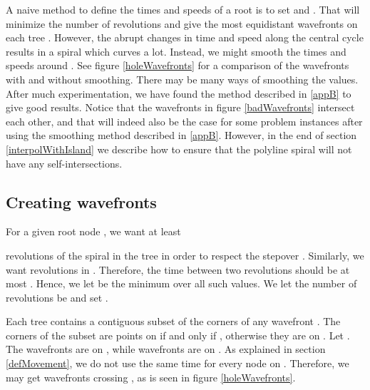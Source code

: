 \documentclass[3p]{elsarticle}
\newcommand{\comm}[1] {}
\begin{document}
A naive method to define the times and speeds of a root  is to set
 and .\comm{} That will
minimize the number of revolutions and give the most equidistant
wavefronts on each tree . However, the abrupt changes in time and speed along the central cycle
 results in a spiral which curves a lot. Instead, we might smooth the times and
speeds around . See figure \ref{holeWavefronts}
for a comparison of the wavefronts with and without smoothing.
There may be many ways of smoothing the values. After much experimentation, we
have found the method described in \ref{appB} to give good results.
Notice that the wavefronts in figure \ref{badWavefronts} intersect each other, and
that will indeed also be the case for some problem instances after using the
smoothing method described in \ref{appB}.
However, in the end of section \ref{interpolWithIsland} we describe how to ensure that the
polyline spiral will not have any self-intersections.

\begin{figure*}
\centering
{}\quad
{}
\caption{
 Wavefronts in red when the times and speeds of the wave in the root nodes
have been defined as described in \ref{appB}.  is in blue and the rest of  is in gray.
 Wavefronts when the preferred times and speeds have been used
to define the movement of the wave.
}
\label{holeWavefronts}
\end{figure*}

\subsection{Creating wavefronts}

For a given root node , we want at least

revolutions of the spiral in the tree  in order to respect the stepover .
Similarly, we want  revolutions in
. Therefore, the time between two revolutions should be
at most .
Hence, we let  be the minimum over all such values.
We let the number of revolutions be  and set
.

Each tree  contains a contiguous subset of the
corners of any wavefront . The corners of the subset are
points on  if and only if , otherwise they are on .
Let .
The wavefronts  are on
, while wavefronts  are on
.
As explained in section \ref{defMovement}, we do not use the same time  for every
node  on . Therefore, we may get wavefronts crossing , as
is seen in figure \ref{holeWavefronts}.
\end{document}
